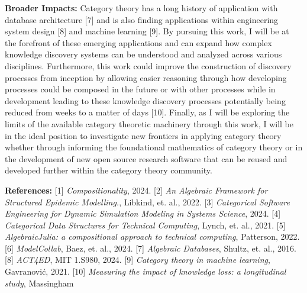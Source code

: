 \documentclass[11pt]{extarticle}
\begin{document}
\textbf{Broader Impacts:} Category theory has a long history of application with database architecture [7] and is also finding applications within engineering system design [8] and machine learning [9].
By pursuing this work, I will be at the forefront of these emerging applications and can expand how complex knowledge discovery systems can be understood and analyzed across various disciplines.
Furthermore, this work could improve the construction of discovery processes from inception by allowing easier reasoning through how developing processes could be composed in the future or with other processes while in development leading to these knowledge discovery processes potentially being reduced from weeks to a matter of days [10].
Finally, as I will be exploring the limits of the available category theoretic machinery through this work, I will be in the ideal position to investigate new frontiers in applying category theory whether through informing the foundational mathematics of category theory or in the development of new open source research software that can be reused and developed further within the category theory community.

\textbf{References:} [1] \textit{Compositionality}, 2024. [2] \textit{An Algebraic Framework for Structured Epidemic Modelling.}, Libkind, et. al., 2022. [3] \textit{Categorical Software Engineering for Dynamic Simulation Modeling in Systems Science}, 2024. [4] \textit{Categorical Data Structures for Technical Computing}, Lynch, et. al., 2021. [5] \textit{AlgebraicJulia: a compositional approach to technical computing}, Patterson, 2022. [6] \textit{ModelCollab}, Baez, et. al., 2024. [7] \textit{Algebraic Databases}, Shultz, et. al., 2016. [8] \textit{ACT4ED}, MIT 1.S980, 2024. [9] \textit{Category theory in machine learning}, Gavranović, 2021. [10] \textit{Measuring the impact of knowledge loss: a longitudinal study}, Massingham
\end{document}
